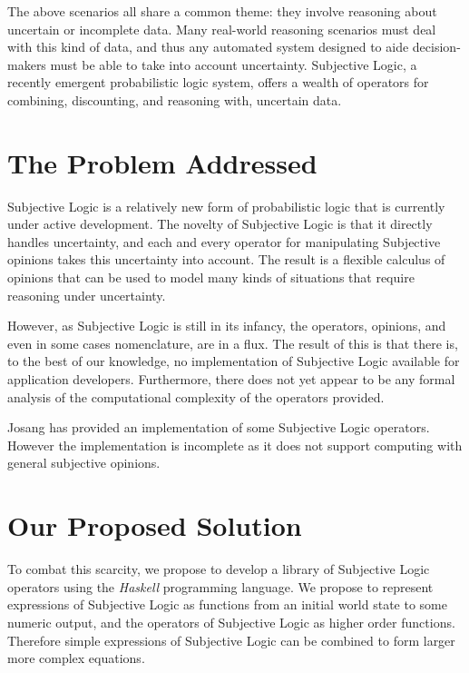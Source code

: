 \documentclass[thesis.tex]{subfiles}
\begin{document}
The above scenarios all share a common theme: they involve reasoning about uncertain or incomplete
data. Many real-world reasoning scenarios must deal with this kind of data, and thus any
automated system designed to aide decision-makers must be able to take into account uncertainty.
Subjective Logic, a recently emergent probabilistic logic system, offers a wealth of operators
for combining, discounting, and reasoning with, uncertain data.


\section{The Problem Addressed}

Subjective Logic is a relatively new form of probabilistic logic that is currently
under active development. The novelty of Subjective Logic is that it
directly handles uncertainty, and each and every operator for manipulating
Subjective opinions takes this uncertainty into account. The result is a
flexible calculus of opinions that can be used to model many kinds of
situations that require reasoning under uncertainty.

However, as Subjective Logic is still in its infancy, the operators, opinions, and
even in some cases nomenclature, are in a flux. The result of this is that
there is, to the best of our knowledge, no implementation of Subjective
Logic available for application developers. Furthermore, there does not
yet appear to be any formal analysis of the computational complexity of
the operators provided.

Josang has provided an implementation of some Subjective Logic operators.
However the implementation is incomplete as it does not support computing
with general subjective opinions.





\section{Our Proposed Solution}

To combat this scarcity, we propose to develop a library of Subjective Logic
operators using the \emph{Haskell} programming language. We propose to represent
expressions of Subjective Logic as functions from an initial world state to some
numeric output, and the operators of Subjective Logic as higher order functions.
Therefore simple expressions of Subjective Logic can be combined to form larger
more complex equations.
\end{document}
